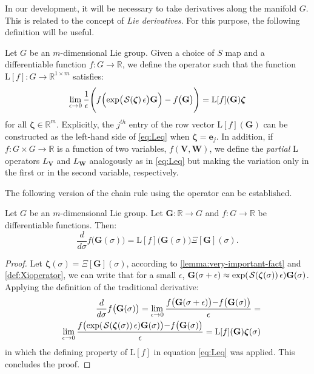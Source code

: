 In our development, it will be necessary to take derivatives along the manifold $G$. This is related to the concept of \emph{Lie derivatives}. For this purpose, the following definition will be useful.
\begin{definition}  \label{def:Loperator} Let $G$ be an $m$-dimensional Lie group. Given a choice of $S$ map and a differentiable function $f: G \to \mathbb{R}$, we define the  operator such that the function $\text{L}[f] : G \to \mathbb{R}^{1 \times m}$ satisfies:
\begin{equation}
\label{eq:Leq}
    \lim_{\epsilon \rightarrow 0} \frac{1}{\epsilon} \Biggl( f\Bigl(\exp\bigl(\SL[\boldsymbol{\zeta}]\epsilon\bigr)\mathbf{G}\Bigr) - f\bigl(\mathbf{G}\bigr) \Biggr) = \text{L}[f](\mathbf{G}) \boldsymbol{\zeta}
\end{equation}
for all $\boldsymbol{\zeta} \in \mathbb{R}^m$. Explicitly, the $j^{th}$ entry of the row vector $\text{L}[f](\mathbf{G})$ can be constructed as the left-hand side of \eqref{eq:Leq} when $\boldsymbol{\zeta} = \mathbf{e}_j$. In addition, if $f: G \times G \to \mathbb{R}$ is a function of two variables, $f(\mathbf{V},\mathbf{W})$, we define the \emph{partial} L operators $L_{\mathbf{V}}$ and $L_{\mathbf{W}}$ analogously as in \eqref{eq:Leq} but making the variation only in the first or in the second variable, respectively. 
\end{definition}

The following version of the chain rule using the  operator can be established.

\begin{lemma}\label{lemma:chainrule}
    Let $G$ be an $m$-dimensional Lie group. Let $\mathbf{G} : \mathbb{R} \to G$ and $f: G \to \mathbb{R}$ be differentiable functions. Then:
    \begin{equation}
       \frac{d}{d\sigma} f\bigl(\mathbf{G}(\sigma)\bigr) = \text{L}[f]\bigl(\mathbf{G}(\sigma)\bigr)\Xi[\mathbf{G}](\sigma).
    \end{equation}
\end{lemma}
\begin{proof}
    Let $\boldsymbol{\zeta}(\sigma) = \Xi[\mathbf{G}](\sigma)$, according to \cref{lemma:very-important-fact} and \cref{def:Xioperator}, we can write that for a small $\epsilon$, $\mathbf{G}(\sigma+\epsilon) \approx \exp(\SL[\boldsymbol{\zeta}(\sigma)]\epsilon)\mathbf{G}(\sigma)$. 
    Applying the definition of the traditional derivative:
    \begin{eqnarray}
      &&\frac{d}{d\sigma} f\bigl(\mathbf{G}(\sigma)\bigr) = \lim_{\epsilon \rightarrow 0} \frac{f\bigl(\mathbf{G}(\sigma+\epsilon)\bigr){-}f\bigl(\mathbf{G}(\sigma)\bigr)}{\epsilon}  =\nonumber \\
      && \lim_{\epsilon \rightarrow 0} \frac{f\bigl(\exp(\SL[\boldsymbol{\zeta}(\sigma)]\epsilon)\mathbf{G}(\sigma)\bigr){-}f\bigl(\mathbf{G}(\sigma)\bigr)}{\epsilon} = \text{L}[f](\mathbf{G}) \boldsymbol{\zeta}(\sigma)\nonumber 
    \end{eqnarray}
    in which the defining property of $\text{L}[f]$ in equation \eqref{eq:Leq} was applied. This concludes the proof.
\end{proof}

